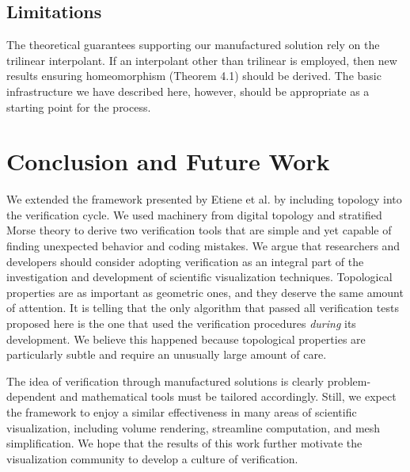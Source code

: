 
\subsection{Limitations}
The theoretical guarantees supporting our manufactured solution
rely on the trilinear interpolant.  
If an interpolant other than trilinear is employed, then new results ensuring
homeomorphism (Theorem 4.1) should be derived. 
The basic infrastructure we have described here, however,
should be appropriate as a starting point for the process.


\section{Conclusion and Future Work}

We extended the framework presented by Etiene et al.
\cite{etiene:tvcg:2009} by including topology into the verification
cycle.  We used machinery from digital topology and stratified Morse
theory to derive two verification tools that are simple and yet
capable of finding unexpected behavior and coding mistakes.
%
We argue that researchers and developers should consider adopting
verification as an integral part of the investigation and development
of scientific visualization techniques.  Topological properties are as
important as geometric ones, and they deserve the same amount of
attention. It is telling that the only algorithm that passed all
verification tests proposed here is the one that used
the verification procedures \emph{during} its development. We believe
this happened because topological properties are particularly subtle
and require an unusually large amount of care.

The idea of verification through manufactured solutions is clearly problem-dependent
and mathematical tools must be tailored accordingly. 
Still, we expect the framework to enjoy a similar effectiveness in many areas of scientific visualization,
including volume rendering, streamline computation, and mesh simplification.
We hope that the results of this work further motivate the visualization
community to develop a culture of verification.

